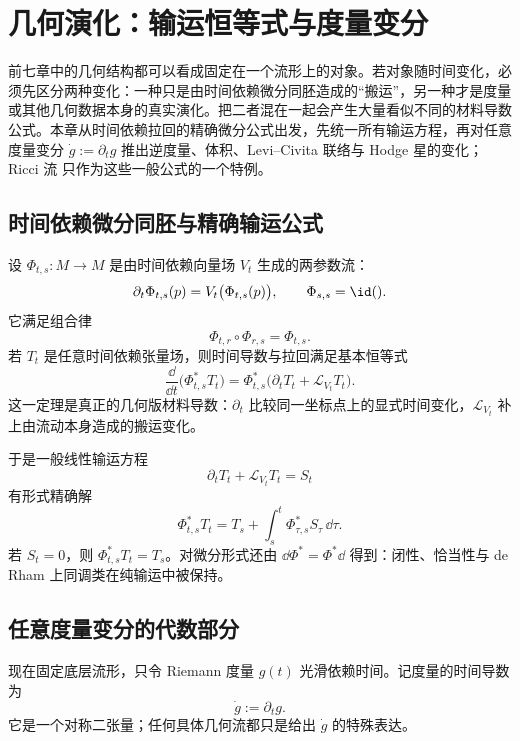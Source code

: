 \chapter{几何演化：输运恒等式与度量变分}

前七章中的几何结构都可以看成固定在一个流形上的对象。若对象随时间变化，必须先区分两种变化：一种只是由时间依赖微分同胚造成的“搬运”，另一种才是度量或其他几何数据本身的真实演化。把二者混在一起会产生大量看似不同的材料导数公式。本章从时间依赖拉回的精确微分公式出发，先统一所有输运方程，再对任意度量变分 $\dot g:=\partial_tg$ 推出逆度量、体积、Levi--Civita 联络与 Hodge 星的变化；Ricci 流 只作为这些一般公式的一个特例。

\section{时间依赖微分同胚与精确输运公式}

设 $\Phi_{t,s}:M\to M$ 是由时间依赖向量场 $V_t$ 生成的两参数流：
\begin{equation*}\partial_t\Phi_{t,s}(p)
=V_t\bigl(\Phi_{t,s}(p)\bigr),
\qquad
\Phi_{s,s}=\id().
\end{equation*}
它满足组合律
\[
\Phi_{t,r}\circ\Phi_{r,s}=\Phi_{t,s}.
\]
若 $T_t$ 是任意时间依赖张量场，则时间导数与拉回满足基本恒等式
\begin{equation}\label{eq:math-dg-transport-identity}
{
\frac{\dd}{\dd t}\bigl(\Phi_{t,s}^*T_t\bigr)
=\Phi_{t,s}^*
\bigl(\partial_tT_t+\mathcal L_{V_t}T_t\bigr).}
\end{equation}
这一定理是真正的几何版材料导数：$\partial_t$ 比较同一坐标点上的显式时间变化，$\mathcal L_{V_t}$ 补上由流动本身造成的搬运变化。

于是一般线性输运方程
\begin{equation*}\partial_tT_t+\mathcal L_{V_t}T_t=S_t
\end{equation*}
有形式精确解
\begin{equation}\label{eq:math-dg-geometric-transport-solution}
{
\Phi_{t,s}^*T_t
=T_s+\int_s^t\Phi_{\tau,s}^*S_\tau\,\dd\tau.}
\end{equation}
若 $S_t=0$，则 $\Phi_{t,s}^*T_t=T_s$。对微分形式还由 $\dd\Phi^*=\Phi^*\dd$ 得到：闭性、恰当性与 de Rham 上同调类在纯输运中被保持。

\section{任意度量变分的代数部分}

现在固定底层流形，只令 Riemann 度量 $g(t)$ 光滑依赖时间。记度量的时间导数为
\begin{equation*}\dot g:=\partial_tg.
\end{equation*}
它是一个对称二张量；任何具体几何流都只是给出 $\dot g$ 的特殊表达。

